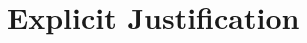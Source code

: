 \documentclass[11pt,titlepage]{report}
\numberwithin{equation}{subsection}
\renewcommand\subsection{\section}
\begin{document}


\subsection{Explicit Justification}\label{explicit}



\end{document}

